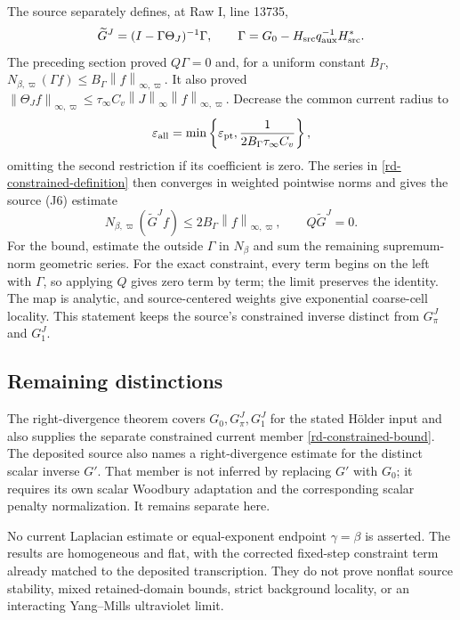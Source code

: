 \documentclass[11pt]{article}
\newcommand{\norm}[1]{\left\lVert#1\right\rVert}
\begin{document}
The source separately defines, at Raw I, line 13735,
\begin{equation}\label{rd-constrained-definition}
 \widetilde G^J=(I-\Gamma\Theta_J)^{-1}\Gamma,
 \qquad
 \Gamma=G_0-H_{\rm src}q_{\rm aux}^{-1}H_{\rm src}^*.
\end{equation}
The preceding section proved $Q\Gamma=0$ and, for a uniform
constant $B_\Gamma$,
$N_{\beta,\varpi}(\Gamma f)
 \le B_\Gamma\norm{f}_{\infty,\varpi}$.
It also proved
$\norm{\Theta_Jf}_{\infty,\varpi}
 \le\tau_\infty C_v\norm{J}_\infty
                      \norm{f}_{\infty,\varpi}$.
Decrease the common current radius to
\begin{equation}\label{rd-constrained-radius}
 \varepsilon_{\rm all}
  =\min\left\{\varepsilon_{\rm pt},
             \frac1{2B_\Gamma\tau_\infty C_v}\right\},
\end{equation}
omitting the second restriction if its coefficient is zero.
The series in \eqref{rd-constrained-definition} then converges in
weighted pointwise norms and gives the source (J6) estimate
\begin{equation}\label{rd-constrained-bound}
 N_{\beta,\varpi}(\widetilde G^Jf)
           \le2B_\Gamma\norm{f}_{\infty,\varpi},\qquad
                 Q\widetilde G^J=0.
\end{equation}
For the bound, estimate the outside $\Gamma$ in $N_\beta$ and
sum the remaining supremum-norm geometric series. For the exact
constraint, every term begins on the left with $\Gamma$, so applying
$Q$ gives zero term by term; the limit preserves the identity.
The map is analytic, and source-centered weights give exponential
coarse-cell locality. This statement keeps the source's constrained
inverse distinct from $G_\pi^J$ and $G_1^J$.

\subsection{Remaining distinctions}

The right-divergence theorem covers $G_0,G_\pi^J,G_1^J$ for the
stated H\"older input and also supplies the separate constrained
current member \eqref{rd-constrained-bound}. The deposited source
also names a right-divergence estimate for the distinct scalar
inverse $G'$. That member is not inferred by replacing $G'$ with
$G_0$; it requires its own scalar Woodbury adaptation and the
corresponding scalar penalty normalization. It remains separate here.

No current Laplacian estimate or equal-exponent endpoint
$\gamma=\beta$ is asserted. The results are homogeneous and flat,
with the corrected fixed-step constraint term already matched to
the deposited transcription. They do not prove nonflat source
stability, mixed retained-domain bounds, strict background locality,
or an interacting Yang--Mills ultraviolet limit.
\end{document}
